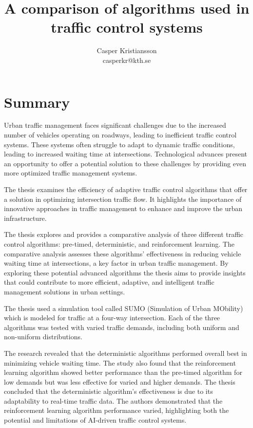 \documentclass[10pt, titlepage]{article}
\begin{document}
\title{A comparison of algorithms used in traffic control systems}
\author{Casper Kristiansson\\casperkr@kth.se}
\maketitle

\section{Summary}
Urban traffic management faces significant challenges due to the increased number of vehicles operating on roadways, leading to inefficient traffic control systems. These systems often struggle to adapt to dynamic traffic conditions, leading to increased waiting time at intersections. Technological advances present an opportunity to offer a potential solution to these challenges by providing even more optimized traffic management systems.

The thesis  \cite{bjorck2018comparison} examines the efficiency of adaptive traffic control algorithms that offer a solution in optimizing intersection traffic flow. It highlights the importance of innovative approaches in traffic management to enhance and improve the urban infrastructure.

The thesis explores and provides a comparative analysis of three different traffic control algorithms: pre-timed, deterministic, and reinforcement learning. The comparative analysis assesses these algorithms' effectiveness in reducing vehicle waiting time at intersections, a key factor in urban traffic management. By exploring these potential advanced algorithms the thesis aims to provide insights that could contribute to more efficient, adaptive, and intelligent traffic management solutions in urban settings.

The thesis used a simulation tool called SUMO (Simulation of Urban MObility) \cite{EclipseS24:online} which is modeled for traffic at a four-way intersection. Each of the three algorithms was tested with varied traffic demands, including both uniform and non-uniform distributions.

The research revealed that the deterministic algorithms performed overall best in minimizing vehicle waiting time. The study also found that the reinforcement learning algorithm showed better performance than the pre-timed algorithm for low demands but was less effective for varied and higher demands. The thesis concluded that the deterministic algorithm's effectiveness is due to its adaptability to real-time traffic data. The authors demonstrated that the reinforcement learning algorithm performance varied, highlighting both the potential and limitations of AI-driven traffic control systems.
\end{document}
